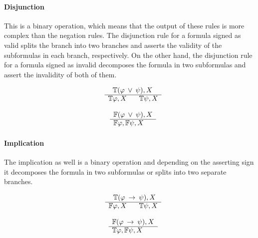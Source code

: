 \documentclass{article}
\begin{document}
		\paragraph{Disjunction}
This is a binary operation, which means that the output of these rules is more complex than the negation rules.
The disjunction rule for a formula signed as valid splits the branch into two branches and asserts the validity of the subformulas in each branch, respectively.
On the other hand, the disjunction rule for a formula signed as invalid decomposes the formula in two subformulas and assert the invalidity of both of them.
		\newline
		\noindent\begin{minipage}{.5\linewidth}
		\begin{align*}
			\begin{array}{rl}
				& \:\:\: \mathbb{T}(\varphi \: \vee \: \psi), X \\
			      \cline{2-2}
			      & \mathbb{T}\varphi, X \:\:\:\:\:\:\:\: \mathbb{T}\psi, X
			\end{array}
		\end{align*}
		\end{minipage}%
		\begin{minipage}{.5\linewidth}
		\begin{align*}
			\begin{array}{rl}
				& \mathbb{F}(\varphi \: \vee \: \psi), X \\
			      \cline{2-2}
			      & \mathbb{F}\varphi, \mathbb{F}\psi, X
			\end{array}
		\end{align*}
		\end{minipage}
		
		\paragraph{Implication}
The implication as well is a binary operation and depending on the asserting sign it decomposes the formula in two subformulas or splits into two separate branches.
		\newline
		\noindent\begin{minipage}{.5\linewidth}
		\begin{align*}
			\begin{array}{rl}
				& \:\:\: \mathbb{T}(\varphi \: \rightarrow \: \psi), X \\
			      \cline{2-2}
			      & \mathbb{F}\varphi, X \:\:\:\:\:\:\:\: \mathbb{T}\psi, X
			\end{array}
		\end{align*}
		\end{minipage}%
		\begin{minipage}{.5\linewidth}
		\begin{align*}
			\begin{array}{rl}
				& \mathbb{F}(\varphi \: \rightarrow \: \psi), X \\
			      \cline{2-2}
			      & \mathbb{T}\varphi, \mathbb{F}\psi, X
			\end{array}
		\end{align*}
		\end{minipage}
		
\end{document}
